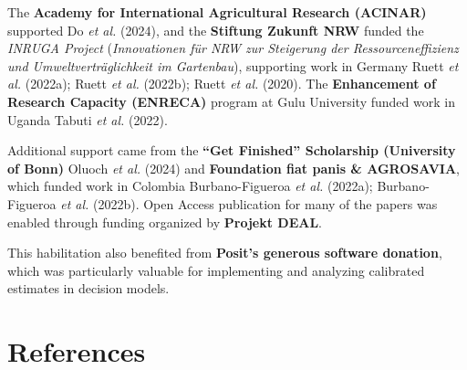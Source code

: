 \documentclass[
]{article}
\begin{document}
The \textbf{Academy for International Agricultural Research (ACINAR)}
supported Do \emph{et al.} (2024), and the \textbf{Stiftung Zukunft NRW}
funded the \emph{INRUGA Project} (\emph{Innovationen für NRW zur
Steigerung der Ressourceneffizienz und Umweltverträglichkeit im
Gartenbau}), supporting work in Germany Ruett \emph{et al.} (2022a);
Ruett \emph{et al.} (2022b); Ruett \emph{et al.} (2020). The
\textbf{Enhancement of Research Capacity (ENRECA)} program at Gulu
University funded work in Uganda Tabuti \emph{et al.} (2022).

Additional support came from the \textbf{``Get Finished'' Scholarship
(University of Bonn)} Oluoch \emph{et al.} (2024) and \textbf{Foundation
fiat panis \& AGROSAVIA}, which funded work in Colombia Burbano-Figueroa
\emph{et al.} (2022a); Burbano-Figueroa \emph{et al.} (2022b). Open
Access publication for many of the papers was enabled through funding
organized by \textbf{Projekt DEAL}.

This habilitation also benefited from \textbf{Posit's generous software
donation}, which was particularly valuable for implementing and
analyzing calibrated estimates in decision models.

\newpage

\hypertarget{references}{%
\section{References}\label{references}}
\end{document}
